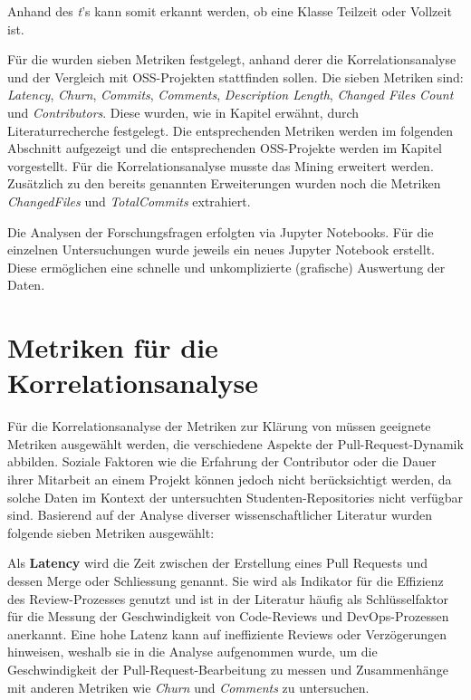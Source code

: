 Anhand des \textit{t}'s kann somit erkannt werden, ob eine Klasse Teilzeit oder Vollzeit ist.

Für die  wurden sieben Metriken festgelegt, anhand derer die Korrelationsanalyse und der Vergleich mit OSS-Projekten stattfinden sollen. Die sieben Metriken sind: \textit{Latency}, \textit{Churn}, \textit{Commits}, \textit{Comments}, \textit{Description Length}, \textit{Changed Files Count} und \textit{Contributors}. Diese wurden, wie in Kapitel  erwähnt, durch Literaturrecherche festgelegt. Die entsprechenden Metriken werden im folgenden Abschnitt  aufgezeigt und die entsprechenden OSS-Projekte werden im Kapitel  vorgestellt. Für die Korrelationsanalyse musste das Mining erweitert werden. Zusätzlich zu den bereits genannten Erweiterungen wurden noch die Metriken \textit{ChangedFiles} und \textit{TotalCommits} extrahiert.

Die Analysen der Forschungsfragen erfolgten via Jupyter Notebooks. Für die einzelnen Untersuchungen wurde jeweils ein neues Jupyter Notebook erstellt. Diese ermöglichen eine schnelle und unkomplizierte (grafische) Auswertung der Daten. \parencite{noauthor_repo-detectivesba-metric-analysis-scripts_nodate}


\section{Metriken für die Korrelationsanalyse}
\label{sec:MetrikenKorrelation}
Für die Korrelationsanalyse der Metriken zur Klärung von  müssen geeignete Metriken ausgewählt werden, die verschiedene Aspekte der Pull-Request-Dynamik abbilden. Soziale Faktoren wie die Erfahrung der Contributor oder die Dauer ihrer Mitarbeit an einem Projekt können jedoch nicht berücksichtigt werden, da solche Daten im Kontext der untersuchten Studenten-Repositories nicht verfügbar sind. Basierend auf der Analyse diverser wissenschaftlicher Literatur wurden folgende sieben Metriken ausgewählt:

Als \textbf{Latency} wird die Zeit zwischen der Erstellung eines Pull Requests und dessen Merge oder Schliessung genannt. Sie wird als Indikator für die Effizienz des Review-Prozesses genutzt und ist in der Literatur häufig als Schlüsselfaktor für die Messung der Geschwindigkeit von Code-Reviews und DevOps-Prozessen anerkannt. Eine hohe Latenz kann auf ineffiziente Reviews oder Verzögerungen hinweisen, weshalb sie in die Analyse aufgenommen wurde, um die Geschwindigkeit der Pull-Request-Bearbeitung zu messen und Zusammenhänge mit anderen Metriken wie \textit{Churn} und \textit{Comments} zu untersuchen. \parencite{yu_wait_2015}

